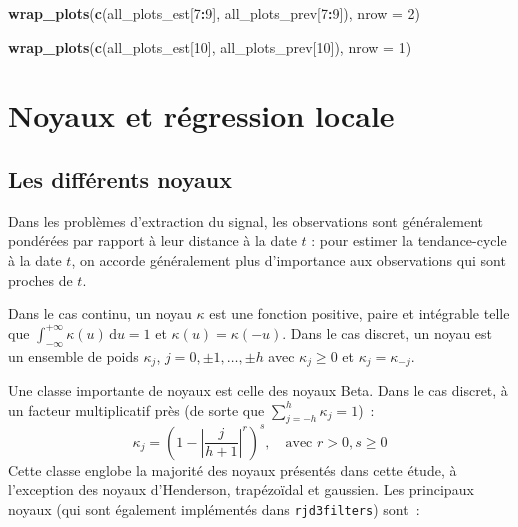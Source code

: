 \documentclass[
  12pt,
  a4paper,french]{article}
\newenvironment{Shaded}{\begin{snugshade}}{\end{snugshade}}
\newcommand{\AttributeTok}[1]{\textcolor[rgb]{0.13,0.29,0.53}{#1}}
\newcommand{\DecValTok}[1]{\textcolor[rgb]{0.00,0.00,0.81}{#1}}
\newcommand{\FunctionTok}[1]{\textcolor[rgb]{0.13,0.29,0.53}{\textbf{#1}}}
\newcommand{\NormalTok}[1]{#1}
\newcommand{\SpecialCharTok}[1]{\textcolor[rgb]{0.81,0.36,0.00}{\textbf{#1}}}
\newcommand\1{\mathds{1}}
\newcommand\ud{\,\mathrm{d}}
\begin{document}
\begin{Shaded}
\begin{Highlighting}[]
\FunctionTok{wrap\_plots}\NormalTok{(}\FunctionTok{c}\NormalTok{(all\_plots\_est[}\DecValTok{7}\SpecialCharTok{:}\DecValTok{9}\NormalTok{],}
\NormalTok{             all\_plots\_prev[}\DecValTok{7}\SpecialCharTok{:}\DecValTok{9}\NormalTok{]), }\AttributeTok{nrow =} \DecValTok{2}\NormalTok{)}

\FunctionTok{wrap\_plots}\NormalTok{(}\FunctionTok{c}\NormalTok{(all\_plots\_est[}\DecValTok{10}\NormalTok{], all\_plots\_prev[}\DecValTok{10}\NormalTok{]), }\AttributeTok{nrow =} \DecValTok{1}\NormalTok{)}
\end{Highlighting}
\end{Shaded}

\hypertarget{an-noyaux}{%
\section{Noyaux et régression locale}\label{an-noyaux}}

\hypertarget{sec-kernels}{%
\subsection{Les différents noyaux}\label{sec-kernels}}

Dans les problèmes d'extraction du signal, les observations sont généralement pondérées par rapport à leur distance à la date \(t\) : pour estimer la tendance-cycle à la date \(t\), on accorde généralement plus d'importance aux observations qui sont proches de \(t\).

Dans le cas continu, un noyau \(\kappa\) est une fonction positive, paire et intégrable telle que \(\int_{-\infty}^{+\infty}\kappa(u) \ud u=1\) et \(\kappa(u)=\kappa(-u)\).
Dans le cas discret, un noyau est un ensemble de poids \(\kappa_j\), \(j=0,\pm1,\dots,\pm h\) avec \(\kappa_j \geq0\) et \(\kappa_j=\kappa_{-j}\).

Une classe importante de noyaux est celle des noyaux Beta.
Dans le cas discret, à un facteur multiplicatif près (de sorte que \(\sum_{j=-h}^h\kappa_j=1\))~:
\[
\kappa_j = \left(
  1-
  \left\lvert
  \frac j {h+1}
  \right\lvert^r
\right)^s,\quad\text{avec }r>0,s\geq 0
\]
Cette classe englobe la majorité des noyaux présentés dans cette étude, à l'exception des noyaux d'Henderson, trapézoïdal et gaussien.
Les principaux noyaux (qui sont également implémentés dans \texttt{rjd3filters}) sont~:
\end{document}
